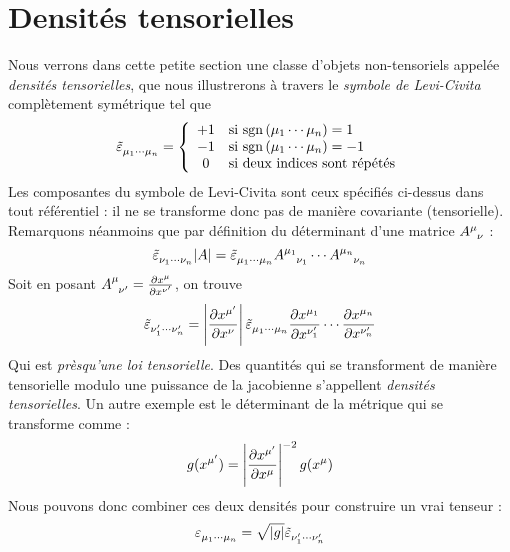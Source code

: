 \section{Densités tensorielles}
Nous verrons dans cette petite section une classe d'objets non-tensoriels appelée \emph{densités tensorielles}, que nous illustrerons à travers le \emph{symbole de Levi-Civita} complètement symétrique tel que
\begin{align}
    \tilde{\varepsilon}\indices{_{\mu_1} _\cdots _{\mu_n}} = \left\{
    \begin{array}{cl}
        +1 & \text{si } \mathrm{sgn} \, (\mu_1\cdots \mu_n) =1 \\
        -1 & \text{si } \mathrm{sgn} \, (\mu_1\cdots \mu_n) =-1\\
        0 & \text{si deux indices sont répétés}
    \end{array}\right.
\end{align}
Les composantes du symbole de Levi-Civita sont ceux spécifiés ci-dessus dans tout référentiel : il ne se transforme donc pas de manière covariante (tensorielle). Remarquons néanmoins que par définition du déterminant d'une matrice $A\indices{^\mu_\nu}$ : 
\begin{equation}
    \tilde{\varepsilon}\indices{_{\nu_1} _\cdots _{\nu_n}} \lvert A \rvert = \tilde{\varepsilon}\indices{_{\mu_1} _\cdots _{\mu_n}} A\indices{^{\mu_1} _{\nu_1}} \cdots A\indices{^{\mu_n} _{\nu_n}}
\end{equation}
Soit en posant $A\indices{^\mu_{\nu'}} = \frac{\pd x^\mu}{\pd x^{\nu'} }$, on trouve
\begin{equation}
    \tilde{\varepsilon}\indices{_{\nu'_1} _\cdots _{\nu'_n}} = \left| \frac{\pd x^{\mu'}}{\pd x^{\nu}} \right|  \tilde{\varepsilon}\indices{_{\mu_1} _\cdots _{\mu_n}} \frac{\pd x^{\mu_1}}{\pd x^{\nu_1'} } \cdots \frac{\pd x^{\mu_n}}{\pd x^{\nu'_n} }
\end{equation}
Qui est \emph{prèsqu'une loi tensorielle}. Des quantités qui se transforment de manière tensorielle modulo une puissance de la jacobienne s'appellent \emph{densités tensorielles}. Un autre exemple est le déterminant de la métrique qui se transforme comme :
\begin{equation}
    g(x^{\mu'}) = \left| \frac{\partial x^{\mu'}}{\partial x^{\mu}} \right|^{-2} g(x^\mu)
\end{equation}
Nous pouvons donc combiner ces deux densités pour construire un vrai tenseur : 
\begin{equation}
    \varepsilon\indices{_{\mu_1} _\cdots _{\mu_n}} = \sqrt{\lvert g\rvert} \tilde{\varepsilon}\indices{_{\nu'_1} _\cdots _{\nu'_n}}
\end{equation}
